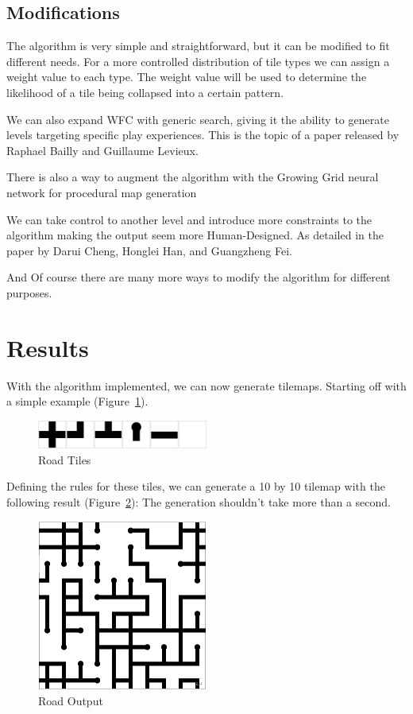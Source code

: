 \documentclass[10pt,oneside,a4paper]{article}
\begin{document}
\subsection{Modifications}\label{sec:modifications}
The algorithm is very simple and straightforward, but it can be modified to fit different needs.
For a more controlled distribution of tile types we can assign a weight value to each type.
The weight value will be used to determine the likelihood of a tile being collapsed into a certain pattern.

We can also expand WFC with generic search, giving it the ability to generate levels targeting specific play experiences.
This is the topic of a paper released by Raphael Bailly and Guillaume Levieux\cite{BL22}.

There is also a way to augment the algorithm with the Growing Grid neural network for procedural map generation~\cite{NMBP20}

We can take control to another level and introduce more constraints to the algorithm making the output seem more Human-Designed.
As detailed in the paper by Darui Cheng, Honglei Han, and Guangzheng Fei\cite{CHF20}.

And Of course there are many more ways to modify the algorithm for different purposes.

\section{Results}\label{sec:results}
With the algorithm implemented, we can now generate tilemaps.
Starting off with a simple example (Figure~\ref{fig:example1}).
\begin{figure}[h]
    \centering
    \includegraphics[width=0.5\textwidth]{figures/road_tiles.png}
    \caption{Road Tiles}\label{fig:example1}
\end{figure}

Defining the rules for these tiles, we can generate a 10 by 10 tilemap with the following result (Figure~\ref{fig:example1map}):
The generation shouldn't take more than a second.

\begin{figure}[h]
    \centering
    \includegraphics[width=0.5\textwidth]{figures/roads_output.png}
    \caption{Road Output}\label{fig:example1map}
\end{figure}
\end{document}
